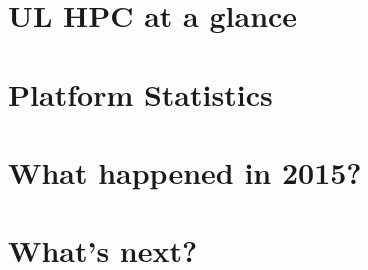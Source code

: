 \documentclass{article}
\begin{document}
\ulhpctoc

\begin{welcome}
  
\end{welcome}


\section{\faCommentAlt\ UL HPC at a glance}

\clearpage

\section{\faBarChart\ Platform Statistics}





\section{\faBullhorn\ What happened in 2015?}


\clearpage

\vspace*{-1em}





\section{\faTime\ What's next?}







\end{document}
